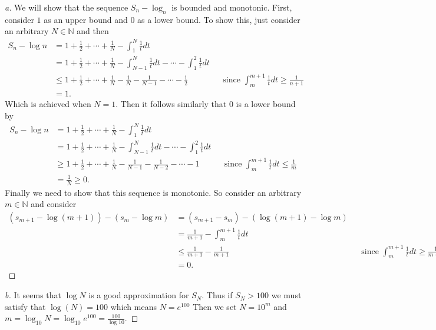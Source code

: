 \documentclass[leqno]{article}
\theoremstyle{nonumberplain}
\newtheorem{proof}{Proof}
\newcommand{\N}{\mathbb{N}}
\begin{document}
\begin{proof}[a]
We will show that the sequence $S_n - \log_n$ is bounded and monotonic.  First, consider $1$ as an upper bound and $0$ as a lower bound.  To show this, just consider an arbitrary $N\in \N$ and then
\begin{align*}
S_n-\log n &= 1+\frac{1}{2}+\cdots + \frac{1}{N} - \int_{1}^N \frac{1}{t} dt\\
&= 1+\frac{1}{2}+\cdots + \frac{1}{N} - \int_{N-1}^N \frac{1}{t}dt - \cdots - \int_{1}^2 \frac{1}{t} dt\\
&\leq 1+\frac{1}{2}+ \cdots + \frac{1}{N} -\frac{1}{N}-\frac{1}{N-1}-\cdots - \frac{1}{2} && \textrm{since $\int_{m}^{m+1} \frac{1}{t} dt \geq \frac{1}{n+1}$}\\
&=1.
\end{align*}
Which is achieved when $N=1$. Then it follows similarly that $0$ is a lower bound by
\begin{align*}
S_n-\log n &= 1+\frac{1}{2}+\cdots + \frac{1}{N} - \int_{1}^N \frac{1}{t} dt\\
&= 1+\frac{1}{2}+\cdots + \frac{1}{N} - \int_{N-1}^N \frac{1}{t}dt - \cdots - \int_{1}^2 \frac{1}{t} dt\\
&\geq 1+\frac{1}{2}+ \cdots + \frac{1}{N} -\frac{1}{N-1}-\frac{1}{N-2}-\cdots - 1 && \textrm{since $\int_{m}^{m+1} \frac{1}{t} dt \leq \frac{1}{m}$}\\
&=\frac{1}{N}\geq 0. 
\end{align*}
Finally we need to show that this sequence is monotonic.  So consider an arbitrary $m\in \N$ and consider
\begin{align*}
(s_{m+1}-\log(m+1))-(s_m-\log m)&= (s_{m+1}-s_m)-(\log(m+1)-\log m)\\
&=\frac{1}{m+1}-\int_m^{m+1} \frac{1}{t} dt\\
&\leq \frac{1}{m+1}-\frac{1}{m+1} && \textrm{since $\int_{m}^{m+1} \frac{1}{t} dt \geq \frac{1}{m+1}$}\\
&=0.
\end{align*}
\end{proof}

\begin{proof}[b]
It seems that $\log N$ is a good approximation for $S_N$.  Thus if $S_{N}>100$ we must satisfy that $\log(N)=100$ which means $N=e^{100}$  Then we set $N=10^m$ and $m=\log_{10} N = \log_{10} e^{100}=\frac{100}{\log{10}}$. 
\end{proof}

\pagebreak
\end{document}
